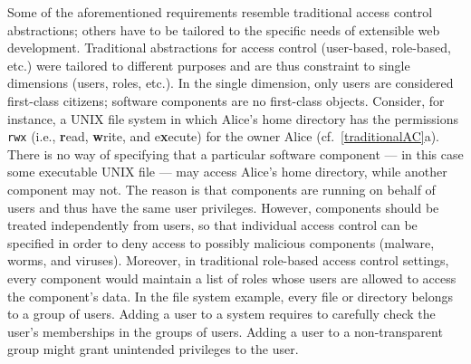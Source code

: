 \documentclass{src/acm_proc_article-sp} \else
\begin{document}
Some of the aforementioned requirements resemble traditional access
control abstractions; others have to be tailored to the specific
needs of extensible web development.
Traditional abstractions for access control (user-based, role-based,
etc.) were tailored to different purposes and are thus constraint to
single dimensions (users, roles, etc.). In the single dimension, only
users are considered first-class citizens; software components are no
first-class objects. Consider, for instance, a UNIX file system in
which Alice's home directory has the permissions \texttt{rwx} (i.e.,
\textbf{r}ead, \textbf{w}rite, and e\textbf{x}ecute) for the owner
Alice (cf.~\autoref{traditionalAC}a). There is no way of specifying
that a particular software component --- in this case some executable
UNIX file --- may access Alice's home directory, while another
component may not. The reason is that components are running on
behalf of users and thus have the same user privileges. However,
components should be treated independently from users, so that
individual access control can be specified in order to deny access to
possibly malicious components (malware, worms, and viruses).
Moreover, in traditional role-based access control settings, every
component would maintain a list of roles whose users are allowed to
access the component's data. In the file system example, every file
or directory belongs to a group of users. Adding a user to a system
requires to carefully check the user's memberships in the groups of
users. Adding a user to a non-transparent group might grant
unintended privileges to the user.
\end{document}
